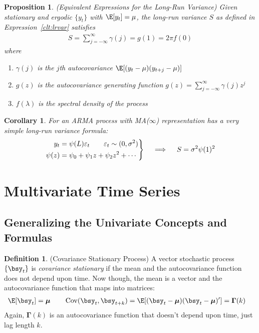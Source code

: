\documentclass[12pt]{article}
\theoremstyle{plain}
\newtheorem{prop}[thm]{Proposition}
\newtheorem{cor}[thm]{Corollary}
\theoremstyle{definition}
\newtheorem{defn}[thm]{Definition}
\theoremstyle{remark}
\newcommand{\bsmu}{\boldsymbol{\mu}}
\newcommand{\bsGamma}{\boldsymbol{\Gamma}}
\newenvironment{rcases}
  {\left.\begin{aligned}}
  {\end{aligned}\right\rbrace}
\newcommand{\Cov}{\operatorname{Cov}}
\begin{document}
\begin{prop}
\emph{(Equivalent Expressions for the Long-Run Variance)}
Given stationary and ergodic $\{y_t\}$ with $\E[y_t]=\mu$, the long-run
variance $S$ as defined in Expression~\ref{clt:lrvar} satisfies
\begin{align*}
  S = \sum_{j=-\infty}^\infty \gamma(j) = g(1) = 2\pi f(0)
\end{align*}
where
\begin{enumerate}[label=(\roman*)]
  \item $\gamma(j)$ is the $j$th autocovariance
    $\E[(y_t-\mu)(y_{t+j}-\mu)]$
  \item $g(z)$ is the autocovariance generating function
    $g(z)=\sum_{j=-\infty}^\infty \gamma(j)z^j$
  \item $f(\lambda)$ is the spectral density of the process
\end{enumerate}
\end{prop}

\begin{cor}
For an ARMA process with MA($\infty$) representation has a very simple
long-run variance formula:
\begin{align*}
  \begin{rcases}
  y_t &= \psi(L)\varepsilon_t
  \qquad \varepsilon_t \sim (0,\sigma^2) \\
  \psi(z) &= \psi_0 + \psi_1z + \psi_2z^2 + \cdots
  \end{rcases}
  \quad\implies\quad
  S = \sigma^2 \psi(1)^2
\end{align*}
\end{cor}

\clearpage
\section{Multivariate Time Series}

\subsection{Generalizing the Univariate Concepts and Formulas}

\begin{defn}(Covariance Stationary Process)
A vector stochastic process $\{\bsy_t\}$ is
\emph{covariance stationary} if the mean and the autocovariance function
does not depend upon time. Now though, the mean is a vector and the
autocovariance function that maps into matrices:
\begin{align*}
  \E[\bsy_t] &= \bsmu
  \qquad
  \Cov(\bsy_t,\bsy_{t+k})
  = \E[(\bsy_t-\bsmu)(\bsy_t-\bsmu)']
  = \bsGamma(k)
\end{align*}
Again, $\bsGamma(k)$ is an autocovariance function that doesn't depend
upon time, just lag length $k$.
\end{defn}
\end{document}
